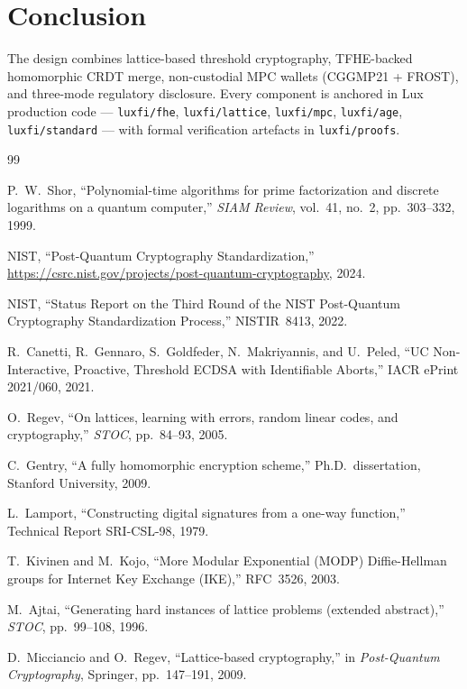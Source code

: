 \section{Conclusion}


The design combines lattice-based threshold cryptography, TFHE-backed
homomorphic CRDT merge, non-custodial MPC wallets (CGGMP21 + FROST),
and three-mode regulatory disclosure. Every component is anchored in
Lux production code --- \texttt{luxfi/fhe}, \texttt{luxfi/lattice},
\texttt{luxfi/mpc}, \texttt{luxfi/age}, \texttt{luxfi/standard} --- with
formal verification artefacts in \texttt{luxfi/proofs}.


\begin{thebibliography}{99}

P.~W.~Shor, ``Polynomial-time algorithms for prime factorization and
discrete logarithms on a quantum computer,'' \textit{SIAM Review},
vol.~41, no.~2, pp.~303--332, 1999.

NIST, ``Post-Quantum Cryptography Standardization,''
\url{https://csrc.nist.gov/projects/post-quantum-cryptography}, 2024.

NIST, ``Status Report on the Third Round of the NIST Post-Quantum
Cryptography Standardization Process,'' NISTIR~8413, 2022.

R.~Canetti, R.~Gennaro, S.~Goldfeder, N.~Makriyannis, and U.~Peled,
``UC Non-Interactive, Proactive, Threshold ECDSA with Identifiable
Aborts,'' IACR ePrint 2021/060, 2021.

O.~Regev, ``On lattices, learning with errors, random linear codes,
and cryptography,'' \textit{STOC}, pp.~84--93, 2005.

C.~Gentry, ``A fully homomorphic encryption scheme,'' Ph.D.\
dissertation, Stanford University, 2009.

L.~Lamport, ``Constructing digital signatures from a one-way
function,'' Technical Report SRI-CSL-98, 1979.

T.~Kivinen and M.~Kojo, ``More Modular Exponential (MODP)
Diffie-Hellman groups for Internet Key Exchange (IKE),'' RFC~3526,
2003.

M.~Ajtai, ``Generating hard instances of lattice problems (extended
abstract),'' \textit{STOC}, pp.~99--108, 1996.

D.~Micciancio and O.~Regev, ``Lattice-based cryptography,'' in
\textit{Post-Quantum Cryptography}, Springer, pp.~147--191, 2009.


\end{thebibliography}
